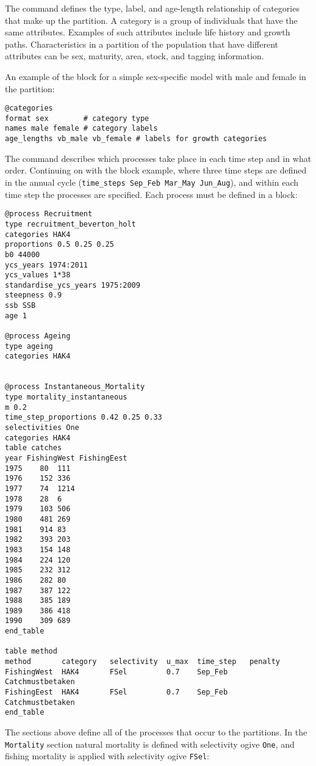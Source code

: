 The  command defines the type, label, and age-length relationship of categories that make up the partition. A category is a group of individuals that have the same attributes. Examples of such attributes include life history and growth paths. Characteristics in a partition of the population that have different attributes can be sex, maturity, area, stock, and tagging information.

An example of the  block for a simple sex-specific model with male and female in the partition:

{\small{\begin{verbatim}
@categories
format sex        # category type
names male female # category labels
age_lengths vb_male vb_female # labels for growth categories
		\end{verbatim}}}

The  command describes which processes take place in each time step and in what order. Continuing on with the  block example, where three time steps are defined in the annual cycle (\texttt{time\_steps Sep\_Feb Mar\_May Jun\_Aug}), and within each time step the processes are specified. Each process must be defined in a  block:

{\small{\begin{verbatim}
@process Recruitment
type recruitment_beverton_holt
categories HAK4
proportions 0.5 0.25 0.25
b0 44000
ycs_years 1974:2011
ycs_values 1*38
standardise_ycs_years 1975:2009
steepness 0.9
ssb SSB
age 1

@process Ageing
type ageing
categories HAK4

		
@process Instantaneous_Mortality
type mortality_instantaneous
m 0.2
time_step_proportions 0.42 0.25 0.33
selectivities One
categories HAK4
table catches
year FishingWest FishingEest
1975	80	111
1976	152	336
1977	74	1214
1978	28	6
1979	103	506
1980	481	269
1981	914	83
1982	393	203
1983	154	148
1984	224	120
1985	232	312
1986	282	80
1987	387	122
1988	385	189
1989	386	418
1990	309	689
end_table
		
table method
method  	 category 	selectivity  u_max 	time_step 	penalty
FishingWest  HAK4   	FSel 		 0.7 	Sep_Feb 	Catchmustbetaken
FishingEest  HAK4   	FSel 		 0.7 	Sep_Feb 	Catchmustbetaken
end_table
\end{verbatim}}}

The sections above define all of the processes that occur to the partitions. In the \texttt{Mortality} section natural mortality is defined with selectivity ogive \texttt{One}, and fishing mortality is applied with selectivity ogive \texttt{FSel}:

